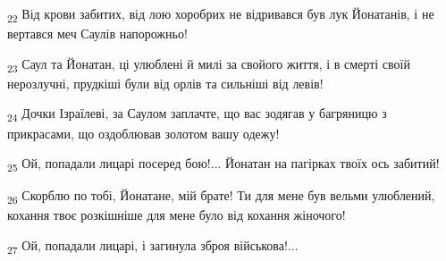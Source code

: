\begin{tcolorbox}
\textsubscript{22} Від крови забитих, від лою хоробрих не відривався був лук Йонатанів, і не вертався меч Саулів напорожньо!
\end{tcolorbox}
\begin{tcolorbox}
\textsubscript{23} Саул та Йонатан, ці улюблені й милі за свойого життя, і в смерті своїй нерозлучні, прудкіші були від орлів та сильніші від левів!
\end{tcolorbox}
\begin{tcolorbox}
\textsubscript{24} Дочки Ізраїлеві, за Саулом заплачте, що вас зодягав у багряницю з прикрасами, що оздоблював золотом вашу одежу!
\end{tcolorbox}
\begin{tcolorbox}
\textsubscript{25} Ой, попадали лицарі посеред бою!... Йонатан на пагірках твоїх ось забитий!
\end{tcolorbox}
\begin{tcolorbox}
\textsubscript{26} Скорблю по тобі, Йонатане, мій брате! Ти для мене був вельми улюблений, кохання твоє розкішніше для мене було від кохання жіночого!
\end{tcolorbox}
\begin{tcolorbox}
\textsubscript{27} Ой, попадали лицарі, і загинула зброя військова!...
\end{tcolorbox}
